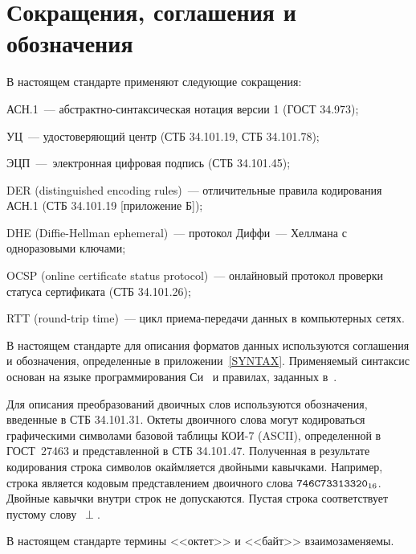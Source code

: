 \chapter{Сокращения, соглашения и обозначения}\label{DEFS}

В настоящем стандарте применяют следующие сокращения:

АСН.1~--- абстрактно-синтаксическая нотация версии 1 (ГОСТ 34.973);

УЦ~--- удостоверяющий центр (СТБ 34.101.19, СТБ 34.101.78);

ЭЦП~---~электронная цифровая подпись (СТБ 34.101.45);

DER (distinguished encoding rules)~--- отличительные правила кодирования АСН.1
(СТБ 34.101.19 [приложение Б]);

DHE (Diffie-Hellman ephemeral)~--- протокол Диффи~--- Хеллмана с одноразовыми 
ключами;

OCSP (online certificate status protocol)~--- онлайновый протокол проверки 
статуса сертификата (СТБ 34.101.26);

RTT (round-trip time)~--- цикл приема-передачи данных в компьютерных сетях.

В настоящем стандарте для описания форматов данных используются соглашения 
и обозначения, определенные в приложении~\ref{SYNTAX}. Применяемый 
синтаксис основан на языке программирования Си~\cite{ISO9899} и правилах, 
заданных в~\cite{RFC4506}.

Для описания преобразований двоичных слов используются обозначения, введенные в 
СТБ 34.101.31.
%
Октеты двоичного слова могут кодироваться графическими символами базовой таблицы 
КОИ-7 (ASCII), определенной в ГОСТ~27463 и представленной в СТБ 34.101.47. 
Полученная в результате кодирования строка символов окаймляется двойными 
кавычками.  
%
Например, строка  является кодовым представлением двоичного 
слова $\texttt{746C73313320}_{16}$.
%
Двойные кавычки внутри строк не допускаются.
%
Пустая строка \str{} соответствует пустому слову~$\perp$.

В настоящем стандарте термины <<октет>> и <<байт>> взаимозаменяемы.

